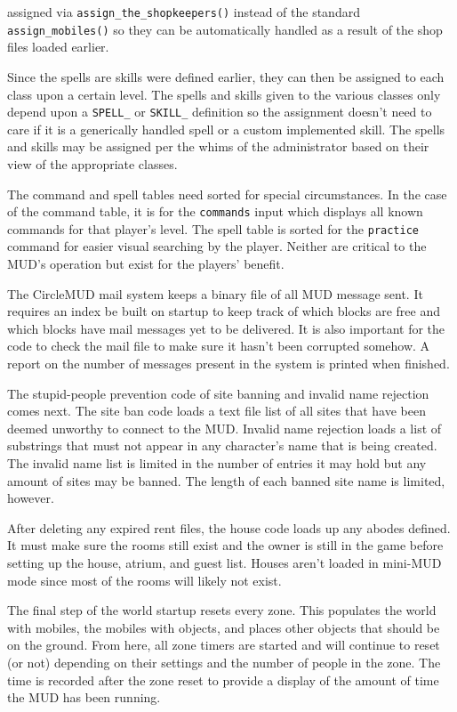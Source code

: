 \documentclass[11pt]{article}
\begin{document}
assigned via \texttt{assign\_the\_shopkeepers()} instead of the standard \texttt{assign\_mobiles()} so they can be automatically handled as a result of the shop files loaded earlier.
\par
Since the spells are skills were defined earlier, they can then be assigned to each class upon a certain level.  The spells and skills given to the various classes only depend upon a \texttt{SPELL\_} or \texttt{SKILL\_} definition so the assignment doesn't need to care if it is a generically handled spell or a custom implemented skill.  The spells and skills may be assigned per the whims of the administrator based on their view of the appropriate classes.
\par
The command and spell tables need sorted for special circumstances. In the case of the command table, it is for the \texttt{commands} input which displays all known commands for that player's level.  The spell table is sorted for the \texttt{practice} command for easier visual searching by the player.  Neither are critical to the MUD's operation but exist for the players' benefit.
\par
The CircleMUD mail system keeps a binary file of all MUD message sent.  It requires an index be built on startup to keep track of which blocks are free and which blocks have mail messages yet to be delivered.  It is also important for the code to check the mail file to make sure it hasn't been corrupted somehow.  A report on the number of messages present in the system is printed when finished.
\par
The stupid-people prevention code of site banning and invalid name rejection comes next.  The site ban code loads a text file list of all sites that have been deemed unworthy to connect to the MUD.  Invalid name rejection loads a list of substrings that must not appear in any character's name that is being created.  The invalid name list is limited in the number of entries it may hold but any amount of sites may be banned. The length of each banned site name is limited, however.
\par
After deleting any expired rent files, the house code loads up any abodes defined.  It must make sure the rooms still exist and the owner is still in the game before setting up the house, atrium, and guest list.  Houses aren't loaded in mini-MUD mode since most of the rooms will likely not exist.
\par
The final step of the world startup resets every zone.  This populates the world with mobiles, the mobiles with objects, and places other objects that should be on the ground.  From here, all zone timers are started and will continue to reset (or not) depending on their settings and the number of people in the zone.  The time is recorded after the zone reset to provide a display of the amount of time the MUD has been running.
\end{document}
